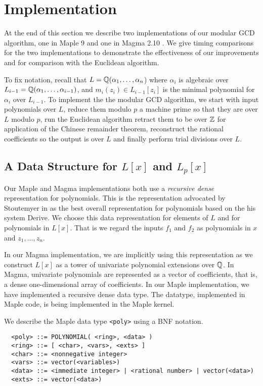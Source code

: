 \documentclass[10pt]{article}
\begin{document}
\section{Implementation}
At the end of this section we describe two implementations of our
modular GCD algorithm, one in Maple 9 \cite{Maple} and one in Magma 2.10 \cite{Magma}.
We give timing comparisons for the two implementations to demonstrate
the effectiveness of our improvements and for comparison with the Euclidean algorithm.

To fix notation, recall that $L = {\mathbb Q}(\alpha_1,\ldots,\alpha_n$)
where $\alpha_i$ is algebraic over $L_{i-1} = {\mathbb Q}(\alpha_1,\ldots,\alpha_{i-1})$,
and $m_i(z_i) \in L_{i-1}[z_i]$ is the minimal polynomial for $\alpha_i$ over $L_{i-1}$.
To implement the the modular GCD algorithm, we start with input polynomials
over $L$, reduce them modulo $p$ a machine prime so that they are over $L$ modulo $p$,
run the Euclidean algorithm retract them to be over ${\mathbb Z}$ for application of the
Chinese remainder theorem, reconstruct the rational coefficients so the output
is over $L$ and finally perform trial divisions over $L$.





\subsection{A Data Structure for $L[x]$ and $L_p[x]$}
Our Maple and Magma implementations both use a {\em recursive
dense} representation for polynomials. This is the representation
advocated by Stoutemyer in \cite{David} as the best overall
representation for polynomials based on the his system Derive.
We choose this data representation for elements of $L$ and for
polynomials in $L[x]$. That is we regard the inputs $f_1$ and $f_2$
as polynomials in $x$ and $z_1,\ldots,z_n$. 

In our Magma implementation, we are implicitly using this representation
as we construct $L[x]$ as a tower of univariate polynomial extensions over
${\mathbb Q}$. In Magma, univariate polynomials are represented as a vector
of coefficients, that is, a dense one-dimensional array of coefficients.
In our Maple implementation, we have implemented a recursive dense data type.
The datatype, implemented in Maple code, is being implemented in the Maple kernel.

We describe the Maple data type {\tt <poly>} using a BNF notation.
\begin{verbatim}
  <poly> ::= POLYNOMIAL( <ring>, <data> )
  <ring> ::= [ <char>, <vars>, <exts> ]
  <char> ::= <nonnegative integer>
  <vars> ::= vector(<variables>)
  <data> ::= <immediate integer> | <rational number> | vector(<data>)
  <exts> ::= vector(<data>)
\end{verbatim}
\end{document}
